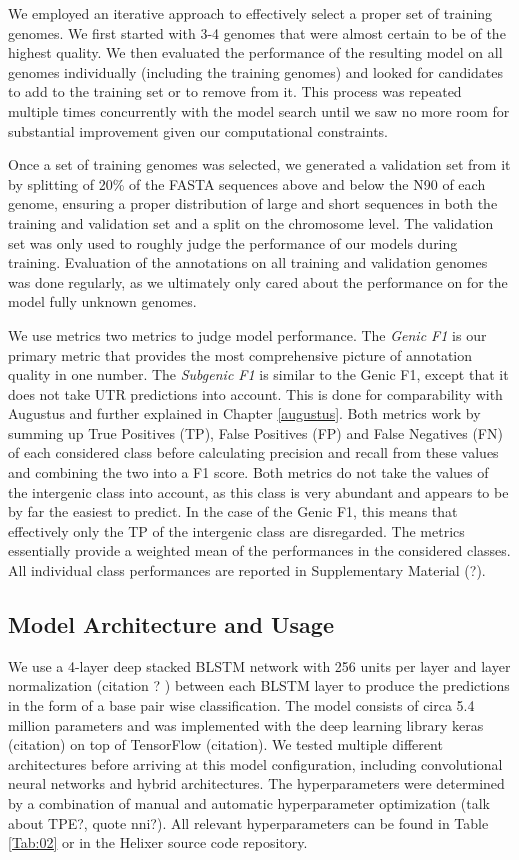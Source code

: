 \documentclass{bioinfo}
\begin{document}
\begin{methods}
We employed an iterative approach to effectively select a proper set of training genomes. We first started with 3-4 genomes that were almost certain to be of the highest quality. We then evaluated the performance of the resulting model on all genomes individually (including the training genomes) and looked for candidates to add to the training set or to remove from it. This process was repeated multiple times concurrently with the model search until we saw no more room for substantial improvement given our computational constraints.

Once a set of training genomes was selected, we generated a validation set from it by splitting of 20\% of the FASTA sequences above and below the N90 of each genome, ensuring a proper distribution of large and short sequences in both the training and validation set and a split on the chromosome level. The validation set was only used to roughly judge the performance of our models during training. Evaluation of the annotations on all training and validation genomes was done regularly, as we ultimately only cared about the performance on for the model fully unknown genomes. 

We use metrics two metrics to judge model performance. The {\it Genic F1} is our primary metric that provides the most comprehensive picture of annotation quality in one number. The {\it Subgenic F1} is similar to the Genic F1, except that it does not take UTR predictions into account. This is done for comparability with Augustus and further explained in Chapter \ref{augustus}. Both metrics work by summing up True Positives (TP), False Positives (FP) and False Negatives (FN) of each considered class before calculating precision and recall from these values and combining the two into a F1 score. Both metrics do not take the values of the intergenic class into account, as this class is very abundant and appears to be by far the easiest to predict. In the case of the Genic F1, this means that effectively only the TP of the intergenic class are disregarded. The metrics essentially provide a weighted mean of the performances in the considered classes. All individual class performances are reported in Supplementary Material (?). 
	
\subsection{Model Architecture and Usage}
We use a 4-layer deep stacked BLSTM network with 256 units per layer and layer normalization (citation ? ) between each BLSTM layer to produce the predictions in the form of a base pair wise classification. The model consists of circa 5.4 million parameters and was implemented with the deep learning library keras (citation) on top of TensorFlow (citation). We tested multiple different architectures before arriving at this model configuration, including convolutional neural networks and hybrid architectures. The hyperparameters were determined by a combination of manual and automatic hyperparameter optimization (talk about TPE?, quote nni?). All relevant hyperparameters can be found in Table \ref{Tab:02} or in the Helixer source code repository. 
	

\end{methods}
\end{document}
